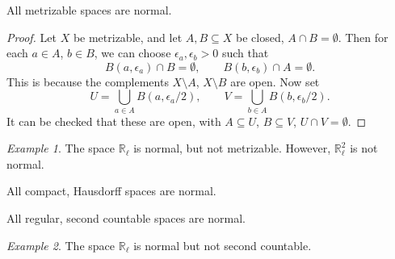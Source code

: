 \documentclass[11pt]{article}
\newcommand{\R}{\mathbb{R}}
\theoremstyle{definition}
\theoremstyle{remark}
\newtheorem*{example}{Example}
\numberwithin{equation}{section}
\begin{document}
    \begin{lemma}
        All metrizable spaces are normal.
    \end{lemma}
    \begin{proof}
        Let $X$ be metrizable, and let $A, B \subseteq X$ be closed, $A \cap B =
        \emptyset$. Then for each $a \in A$, $b \in B$, we can choose $\epsilon_a,
        \epsilon_b > 0$ such that \[
            B(a, \epsilon_a) \cap B = \emptyset, \qquad
            B(b, \epsilon_b) \cap A = \emptyset.
        \] This is because the complements $X\setminus A$, $X\setminus B$ are open.
        Now set \[
            U = \bigcup_{a \in A} B(a, \epsilon_a / 2), \qquad
            V = \bigcup_{b \in A} B(b, \epsilon_b / 2).
        \] It can be checked that these are open, with $A \subseteq U$, $B \subseteq
        V$, $U \cap V = \emptyset$.
    \end{proof}
    
    \begin{example}
        The space $\R_\ell$ is normal, but not metrizable. However, $\R_\ell^2$ is
        not normal.
    \end{example}

    \begin{theorem}
        All compact, Hausdorff spaces are normal.
    \end{theorem}

    \begin{theorem}
        All regular, second countable spaces are normal.
    \end{theorem}

    \begin{example}
        The space $\R_\ell$ is normal but not second countable.
    \end{example}
\end{document}
